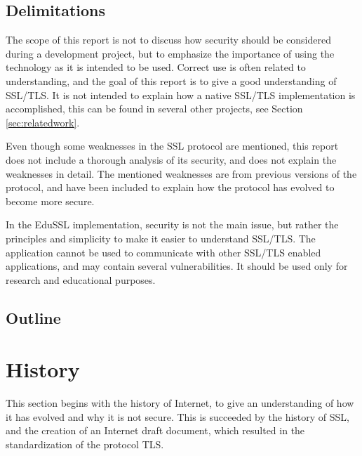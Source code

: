 \documentclass[12pt,a4paper,titlepage]{report}
\begin{document}
\section{Delimitations}

The scope of this report is not to discuss how security should be considered during a development project, but to emphasize the importance of using the technology as it is intended to be used. Correct use is often related to understanding, and the goal of this report is to give a good understanding of SSL/TLS. It is not intended to explain how a native SSL/TLS implementation is accomplished, this can be found in several other projects, see Section \ref{sec:relatedwork}. 

Even though some weaknesses in the SSL protocol are mentioned, this report does not include a thorough analysis of its security, and does not explain the weaknesses in detail. The mentioned weaknesses are from previous versions of the protocol, and have been included to explain how the protocol has evolved to become more secure.

In the EduSSL implementation, security is not the main issue, but rather the principles and simplicity to make it easier to understand SSL/TLS. The application cannot be used to communicate with other SSL/TLS enabled applications, and may contain several vulnerabilities. It should be used only for research and educational purposes.

\section{Outline}

\newpage
\chapter{History}
\label{sec:history}
This section begins with the history of Internet, to give an understanding of how it has evolved and why it is not secure. This is succeeded by the history of SSL, and the creation of an Internet draft document, which resulted in the standardization of the protocol TLS.
\end{document}
